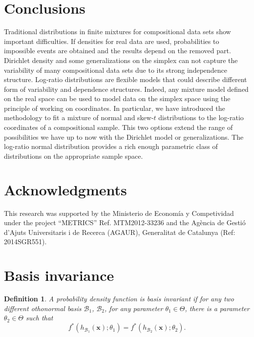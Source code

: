 \documentclass[12pt, a4paper]{article}
\newtheorem{definition}{Definition}
\begin{document}
\section{Conclusions}
\label{conclusion_section}
Traditional distributions in finite mixtures for compositional data sets show important difficulties. If densities for real data are used, probabilities to impossible events are obtained and the results depend on the removed part. Dirichlet density and some generalizations on the simplex can not capture the variability of many compositional data sets due to its strong independence structure. Log-ratio distributions are flexible models that could describe different form of variability and dependence structures. Indeed, any mixture model defined on the real space can be used to model data on the simplex space using the principle of working on coordinates. In particular, we have introduced the methodology to fit a mixture of normal and skew-$t$ distributions to the log-ratio coordinates of a compositional sample. This two options extend the range of possibilities we have up to now with the Dirichlet model or generalizations. The log-ratio normal distribution provides a rich enough parametric class of distributions on the appropriate sample space. 

\section*{Acknowledgments}
This research was supported by the Ministerio de Econom\'ia y Competividad under the project
``METRICS'' Ref. MTM2012-33236 and the Agència de Gestió d'Ajuts Universitaris i de Recerca (AGAUR), Generalitat de Catalunya (Ref: 2014SGR551).



{}

\newpage
\appendix
\section{Basis invariance}

\begin{definition}
A probability density function is \emph{basis invariant} if for any two different othonormal basis $\mathcal{B}_1$, $\mathcal{B}_2$, for any parameter $\theta_1 \in \Theta$, there is a parameter $\theta_2 \in \Theta$ such that
\[
f^*(h_{\mathcal{B}_1}(\textbf{x}); \theta_1) = f^*(h_{\mathcal{B}_2}(\textbf{x}); \theta_2).
\]

\end{definition}
\end{document}
